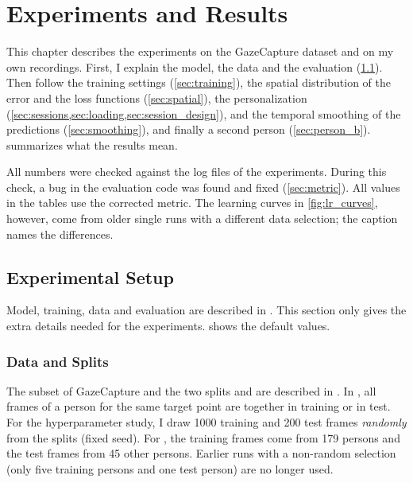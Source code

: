 \chapter{Experiments and Results}
\label{ch:results}

This chapter describes the experiments on the GazeCapture dataset
\cite{krafka2016itracker} and on my own recordings. First, I explain the model,
the data and the evaluation (\cref{sec:setup}). Then follow the training
settings (\cref{sec:training}), the spatial distribution of the error and the
loss functions (\cref{sec:spatial}), the personalization
(\cref{sec:sessions,sec:loading,sec:session_design}), and the temporal
smoothing of the predictions (\cref{sec:smoothing}), and finally a second
person (\cref{sec:person_b}).
 summarizes what the results mean.

All numbers were checked against the log files of the experiments. During this
check, a bug in the evaluation code was found and fixed (\cref{sec:metric}).
All values in the tables use the corrected metric. The learning curves in
\cref{fig:lr_curves}, however, come from older single runs with a different
data selection; the caption names the differences.

\section{Experimental Setup}
\label{sec:setup}

Model, training, data and evaluation are described in . This section only gives the extra details
needed for the experiments.  shows the default values.

\subsection{Data and Splits}
\label{sec:data}

The subset of GazeCapture and the two splits  and
 are described in
. In
, all frames of a person for the same target point are
together in training or in test. For the hyperparameter study, I draw \num{1000} training and \num{200} test
frames \emph{randomly} from the splits (fixed seed). For , the training frames come
from 179 persons and the test frames from 45 other persons. Earlier runs
with a non-random selection (only five training persons and one test person)
are no longer used.


